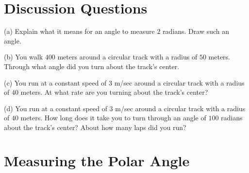 \documentclass{ximera}
\begin{document}
\section{Discussion Questions}
\begin{question}  \label{Q2873:Angles}
(a) Explain what it means for an angle to measure $2$ radians. Draw such an angle.

(b) You walk $400$ meters around a circular track with a radius of $50$ meters. Through what angle did you turn about the track's center.

(c) You run at a constant speed of $3$ m/sec around a circular track with a radius of $40$ meters. At what rate are you turning about the track's center?

(d) You run at a constant speed of $3$ m/sec around a circular track with a radius of $40$ meters. How long does it take you to turn through an angle of $100$ radians about the track's center? About how many laps did you run?


\end{question}




\section{Measuring the Polar Angle}



 
 
\end{document}
